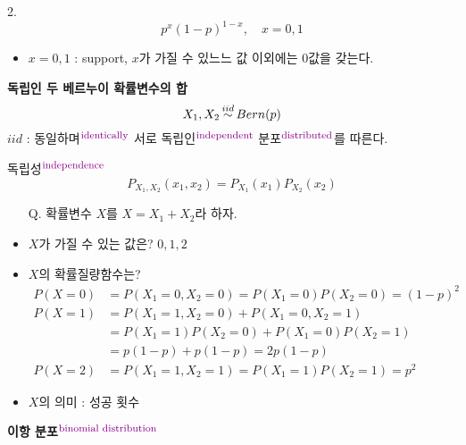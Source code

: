 \documentclass{oblivoir}
\newcommand{\DC}[1]{\textcolor{DarkMagenta}{#1}}%
\newcommand{\UP}[1]{$^{\mbox{\DC{\footnotesize #1}}}$}
\newcommand\iidsim{\stackrel{\mathclap{iid}}{\sim}}
\begin{document}
2.
$$
p^x(1-p)^{1-x}, \quad x = 0, 1
$$
\begin{itemize}
\item $x = 0,1$ : support, $x$가 가질 수 있느느 값 이외에는 0값을 갖는다.
\end{itemize}
\textbf{독립인 두 베르누이 확률변수의 합}
$$
X_1, X_2 \iidsim Bern(p)
$$
$iid$ : 동일하며\UP{identically} 서로 독립인\UP{independent} 분포\UP{distributed}를 따른다.
\begin{myframe}{독립성\UP{independence}}
$$
P_{X_1,X_2}(x_1,x_2) = P_{X_1}(x_1)P_{X_2}(x_2)
$$
\end{myframe}
\begin{itemize}
\item[Q.] 확률변수 $X$를 $X = X_1 + X_2$라 하자.
\item $X$가 가질 수 있는 값은?  $0,1,2$
\item $X$의 확률질량함수는?
\begin{align*}
P(X = 0) &= P(X_1 = 0, X_2 = 0) = P(X_1 = 0) P(X_2 = 0) = (1-p)^2 \\
P(X = 1) &= P(X_1 = 1, X_2 = 0) + P(X_1 = 0, X_2 = 1)  \\
&= P(X_1 = 1) P(X_2 = 0) + P(X_1 = 0) P(X_2 = 1)\\
&= p(1-p) + p(1-p) = 2p(1-p) \\
P(X = 2) &= P(X_1 = 1, X_2 = 1) = P(X_1 = 1) P(X_2 = 1) = p^2 
\end{align*}
\item $X$의 의미 : 성공 횟수
\end{itemize}
\textbf{이항 분포}\UP{binomial distribution}
\end{document}
